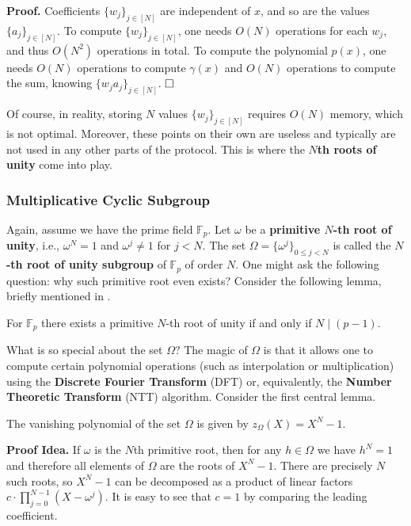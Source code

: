 \documentclass[../../book.tex]{subfiles}
\begin{document}
\textbf{Proof.} Coefficients $\{w_j\}_{j \in [N]}$ are independent of $x$, and so 
are the values $\{a_j\}_{j \in [N]}$. To compute $\{w_j\}_{j \in [N]}$, one needs 
$O(N)$ operations for each $w_j$, and thus $O(N^2)$ operations in total. To compute
the polynomial $p(x)$, one needs $O(N)$ operations to compute $\gamma(x)$ and 
$O(N)$ operations to compute the sum, knowing $\{w_ja_j\}_{j \in [N]}$. $\hfill\Box$

Of course, in reality, storing $N$ values $\{w_j\}_{j \in [N]}$ requires $O(N)$
memory, which is not optimal. Moreover, these points on their own are useless 
and typically are not used in any other parts of the protocol. This is where the
\textbf{$N$th roots of unity} come into play.

\subsubsection{Multiplicative Cyclic Subgroup}\label{section:mult-cyclic-g}

Again, assume we have the prime field $\mathbb{F}_p$. Let $\omega$ be a
\textbf{primitive $N$-th root of unity}, i.e., $\omega^N = 1$ and $\omega^j \neq
1$ for $j < N$. The set $\Omega = \{\omega^j\}_{0 \le j < N}$ is called
the \textbf{$N$-th root of unity subgroup} of $\mathbb{F}_p$ of order $N$. One
might ask the following question: why such primitive root even exists? Consider
the following lemma, briefly mentioned in
.

\begin{lemma}
    For $\mathbb{F}_p$ there exists a primitive $N$-th root of unity
    if and only if $N \mid (p-1)$. 
\end{lemma}
What is so special about the set $\Omega$? The magic of $\Omega$ is that it
allows one to compute certain polynomial operations (such as interpolation or
multiplication) using the \textbf{Discrete Fourier Transform} (DFT) or, 
equivalently, the \textbf{Number Theoretic Transform} (NTT) algorithm. 
Consider the first central lemma.

\begin{lemma}\label{lemma:vanishing-polynomial}
    The vanishing polynomial of the set $\Omega$ is given by $z_{\Omega}(X) = X^N - 1$.
\end{lemma}

\textbf{Proof Idea.} If $\omega$ is the $N$th primitive root, then for any $h
\in \Omega$ we have $h^N = 1$ and therefore all elements of $\Omega$ are the
roots of $X^N-1$. There are precisely $N$ such roots, so $X^N-1$ can be 
decomposed as a product of linear factors $c \cdot \prod_{j=0}^{N-1}(X-\omega^j)$. 
It is easy to see that $c=1$ by comparing the leading coefficient. 
\end{document}
